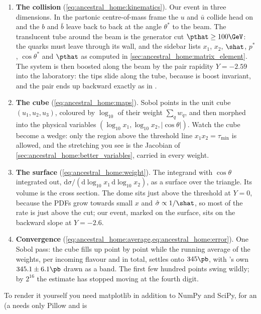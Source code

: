 \begin{enumerate}
  \item \textbf{The collision} (\cref{eq:ancestral_home:kinematics}). Our
    event in three dimensions. In the partonic centre-of-mass frame the $u$
    and $\bar u$ collide head on and the $b$ and $\bar b$ leave back to back
    at the angle $\theta^{*}$ to the beam. The translucent tube around the
    beam is the generator cut $\pthat\ge100\GeV$: the quarks must leave
    through its wall, and the sidebar lists $x_1$, $x_2$, $\shat$, $p^{*}$,
    $\cos\theta^{*}$ and $\pthat$ as computed in
    \cref{sec:ancestral_home:matrix_element}. The system is then boosted
    along the beam by the pair rapidity $Y=-2.59$ into the laboratory: the
    tips slide along the tube, because \pt is boost invariant, and the pair
    ends up backward exactly as in .
  \item \textbf{The cube} (\cref{eq:ancestral_home:maps}). Sobol points in
    the unit cube $(u_1,u_2,u_3)$, coloured by $\log_{10}$ of their weight
    $\sum_q w_q$, and then morphed into the physical variables
    $(\log_{10}x_1,\log_{10}x_2,|\cos\theta|)$. Watch the cube become a
    wedge: only the region above the threshold line $x_1x_2=\tau_{\min}$ is
    allowed, and the stretching you see is the Jacobian of
    \cref{sec:ancestral_home:better_variables}, carried in every weight.
  \item \textbf{The surface} (\cref{eq:ancestral_home:weight}). The
    integrand with $\cos\theta$ integrated out,
    $\mathrm{d}\sigma/(\mathrm{d}\log_{10}x_1\,\mathrm{d}\log_{10}x_2)$, as a
    surface over the triangle. Its volume is the cross section. The dome
    sits just above the threshold at $Y=0$, because the PDFs grow towards
    small $x$ and $\hat\sigma\propto1/\shat$, so most of the rate is just
    above the cut; our event, marked on the surface, sits on the backward
    slope at $Y=-2.6$.
  \item \textbf{Convergence} (\cref{eq:ancestral_home:average,eq:ancestral_home:error}).
    One Sobol pass: the cube fills up point by point while the running
    average of the weights, per incoming flavour and in total, settles onto
    $345\pb$, with \PYTHIA's own $345.1\pm6.1\pb$ drawn as a band. The first
    few hundred points swing wildly; by $2^{16}$ the estimate has stopped
    moving at the fourth digit.
\end{enumerate}
To render it yourself you need matplotlib in addition to NumPy and SciPy,
 for an  (a  needs only Pillow and is
